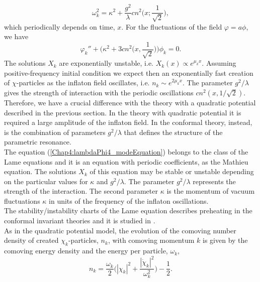 \documentclass[11pt,a4paper,twoside]{book}
\begin{document}
\begin{equation}
\label{Chap4:lambdaPhi4_frequency}
\omega^{2}_{k}=\kappa^{2} + \frac{g^{2}}{\lambda}cn^{2}\Bigg(x;\frac{1}{\sqrt{2}}\Bigg),
\end{equation}
which periodically depends on time, $ x $. For the fluctuations of the field $ \varphi = a\phi $, we have
\begin{equation}
\label{Chap4:lambdaPhi4}
\varphi_{k}'' + \Bigg(\kappa^{2} + 3cn^{2}\Bigg(x,\frac{1}{\sqrt{2}}\Bigg)\Bigg)\phi_{k} = 0.
\end{equation}
The solutions $ X_{k} $ are exponentially unstable, i.e. $ X_{k}(x) \propto e^{\mu_{k}x} $. Assuming positive-frequency initial condition we expect then an exponentially fast creation of $\chi$-particles as the inflaton field oscillates, i.e. $ n_{k} \sim e^{2\mu_{k}x} $. The parameter $ g^{2}/\lambda $ gives the strength of interaction with the periodic oscillations $ cn^{2}(x,1/\sqrt{2}) $. Therefore, we have a crucial difference with the theory with a quadratic potential described in the previous section. In the theory with quadratic potential it is required a large amplitude of the inflaton field. In the conformal theory, instead, is the combination of parameters $ g^{2}/\lambda $ that defines the structure of the parametric resonance.\\
The equation (\ref{Chap4:lambdaPhi4_modeEquation}) belongs to the class of the Lame equations and it is an equation with periodic coefficients, as the Mathieu equation. The solutions $ X_{k} $ of this equation may be stable or unstable depending on the particular values for $ \kappa $ and $ g^{2}/\lambda $. The parameter $ g^{2}/\lambda  $ represents the strength of the interaction. The second parameter $\kappa$ is the momentum of vacuum fluctuations $\kappa$ in units of the frequency of the inflaton oscillations.\\
The stability/instability charts of the Lame equation describes preheating in the conformal invariant theories and it is studied in \cite{Chap4:ModelLambdaPhi4Reference}.\\
As in the quadratic potential model, the evolution of the comoving number density of created $\chi_{k}$-particles, $ n_{k} $, with comoving momentum $ k $ is given by the comoving energy density and the energy per particle, $\omega_{k}$,
\begin{equation}
\label{Chap4:lambdaPhi4Model}
n_{k}=\frac{\omega_{k}}{2}\Bigg(|\chi_{k}|^{2} + \frac{|\dot{\chi}_{k}|^{2}}{\omega_{k}^{2}}\Bigg) - \frac{1}{2}.
\end{equation}
\end{document}
